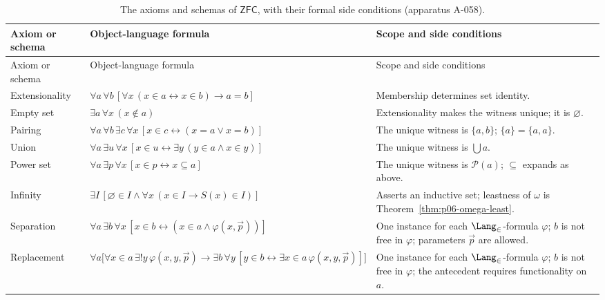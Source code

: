 \begingroup\footnotesize
\begin{longtable}{@{}p{}p{}p{}@{}}
\caption{The axioms and schemas of \(\mathsf{ZFC}\), with their formal side
conditions (apparatus A-058).}\label{tab:p06-zfc-axioms}\\
\toprule
Axiom or schema & Object-language formula & Scope and side conditions \\
\midrule
\endfirsthead
\toprule
Axiom or schema & Object-language formula & Scope and side conditions \\
\midrule
\endhead
Extensionality\index{Axiom of Extensionality} &
\(\forall a\,\forall b\,[\forall x\,(x\in a\leftrightarrow x\in b)\to a=b]\) &
Membership determines set identity. \\
\addlinespace
Empty set\index{empty-set axiom} &
\(\exists a\,\forall x\,(x\notin a)\) &
Extensionality makes the witness unique; it is \(\varnothing\). \\
\addlinespace
Pairing\index{pairing axiom} &
\(\forall a\,\forall b\,\exists c\,\forall x\,[x\in c\leftrightarrow
(x=a\lor x=b)]\) &
The unique witness is \(\{a,b\}\); \(\{a\}=\{a,a\}\). \\
\addlinespace
Union\index{union axiom} &
\(\forall a\,\exists u\,\forall x\,[x\in u\leftrightarrow
\exists y\,(y\in a\land x\in y)]\) &
The unique witness is \(\bigcup a\). \\
\addlinespace
Power set\index{power-set axiom} &
\(\forall a\,\exists p\,\forall x\,[x\in p\leftrightarrow x\subseteq a]\) &
The unique witness is \(\mathcal P(a)\); \(\subseteq\) expands as above. \\
\addlinespace
Infinity\index{axiom of infinity} &
\(\exists I\,[\varnothing\in I\land
\forall x\,(x\in I\to S(x)\in I)]\) &
Asserts an inductive set; leastness of \(\omega\) is Theorem~\ref{thm:p06-omega-least}. \\
\addlinespace
Separation\index{separation schema} &
\(\forall a\,\exists b\,\forall x\,[x\in b\leftrightarrow
(x\in a\land\varphi(x,\vec p))]\) &
One instance for each \(\Lang_{\in}\)-formula \(\varphi\); \(b\) is not free
in \(\varphi\); parameters \(\vec p\) are allowed. \\
\addlinespace
Replacement\index{replacement schema} &
\(\displaystyle
\forall a\bigl[\forall x\in a\,\exists!y\,\varphi(x,y,\vec p)\to
\exists b\,\forall y\,[y\in b\leftrightarrow
\exists x\in a\,\varphi(x,y,\vec p)]\bigr]\) &
One instance for each \(\Lang_{\in}\)-formula \(\varphi\); \(b\) is not free
in \(\varphi\); the antecedent requires functionality on \(a\). \\

\end{longtable}
